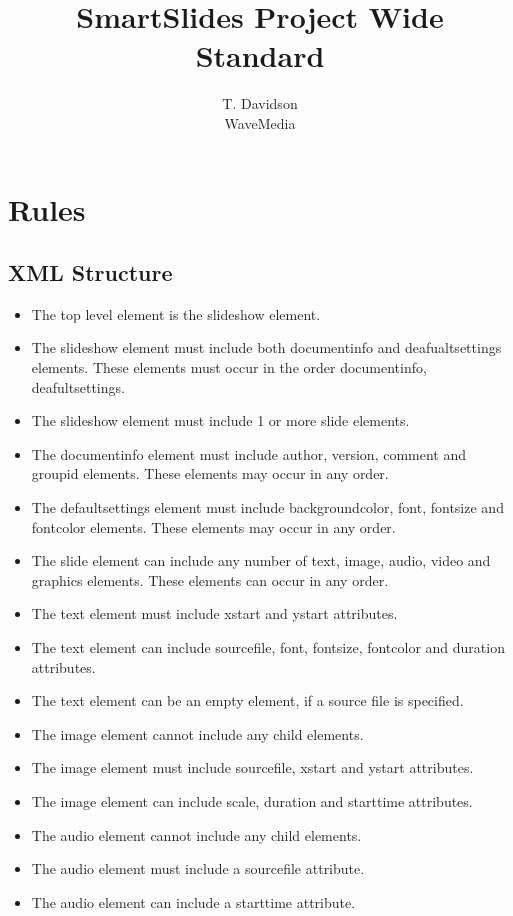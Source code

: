 \documentclass{article}
\title{SmartSlides Project Wide Standard}
\author{T. Davidson \\ WaveMedia}
\begin{document}
\maketitle

\clearpage
\tableofcontents
\clearpage

\section{Rules}
\subsection{XML Structure}
\begin{itemize}
\item The top level element is the slideshow element.
\item The slideshow element must include both documentinfo and deafualtsettings elements. These elements must occur in the order documentinfo, deafultsettings.
\item The slideshow element must include 1 or more slide elements.
\item The documentinfo element must include author, version, comment and groupid elements. These elements may occur in any order.
\item The defaultsettings element must include backgroundcolor, font, fontsize and fontcolor elements. These elements may occur in any order.
\item The slide element can include any number of text, image, audio, video and graphics elements. These elements can occur in any order.
\item The text element must include xstart and ystart attributes.
\item The text element can include sourcefile, font, fontsize, fontcolor and duration attributes.
\item The text element can be an empty element, if a source file is specified.
\item The image element cannot include any child elements.
\item The image element must include sourcefile, xstart and ystart attributes.
\item The image element can include scale, duration and starttime attributes.
\item The audio element cannot include any child elements.
\item The audio element must include a sourcefile attribute.
\item The audio element can include a starttime attribute.

\end{itemize}
\end{document}
